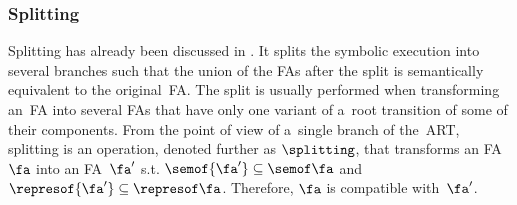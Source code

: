 %
%

\subsubsection*{Splitting}\label{sec:label}
Splitting has already been discussed in .
It splits the symbolic execution into several branches such that the union of
the FAs after the split is semantically equivalent to the original~FA.
%
The split is usually performed when transforming an~FA into several FAs that
have only one variant of a~root transition of some of their components.
%
From the point of view of a~single branch of the~ART,
splitting is an operation, denoted further as $\splitting$, that transforms an
FA $\fa$
into an FA~$\fa'$ s.t. $\semof{\fa'}\subseteq\semof\fa$ and 
$\represof{\fa'}\subseteq\represof\fa$.
Therefore, $\fa$ is compatible with~$\fa'$.

